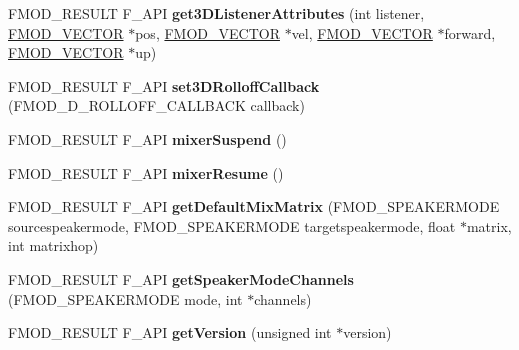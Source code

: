 \begin{DoxyCompactItemize}
\item 
\mbox{\label{classFMOD_1_1System_af141ec87d96230c1c445d6e3c2de224a}} 
F\+M\+O\+D\+\_\+\+R\+E\+S\+U\+LT F\+\_\+\+A\+PI {\bfseries get3\+D\+Listener\+Attributes} (int listener, \hyperlink{structFMOD__VECTOR}{F\+M\+O\+D\+\_\+\+V\+E\+C\+T\+OR} $\ast$pos, \hyperlink{structFMOD__VECTOR}{F\+M\+O\+D\+\_\+\+V\+E\+C\+T\+OR} $\ast$vel, \hyperlink{structFMOD__VECTOR}{F\+M\+O\+D\+\_\+\+V\+E\+C\+T\+OR} $\ast$forward, \hyperlink{structFMOD__VECTOR}{F\+M\+O\+D\+\_\+\+V\+E\+C\+T\+OR} $\ast$up)
\item 
\mbox{\label{classFMOD_1_1System_a4c1e8040d33a4a1852a31a2ec2e64aa7}} 
F\+M\+O\+D\+\_\+\+R\+E\+S\+U\+LT F\+\_\+\+A\+PI {\bfseries set3\+D\+Rolloff\+Callback} (F\+M\+O\+D\+\_\+D\+\_\+\+R\+O\+L\+L\+O\+F\+F\+\_\+\+C\+A\+L\+L\+B\+A\+CK callback)
\item 
\mbox{\label{classFMOD_1_1System_a6e53642e611a3d789821576dc95a2e20}} 
F\+M\+O\+D\+\_\+\+R\+E\+S\+U\+LT F\+\_\+\+A\+PI {\bfseries mixer\+Suspend} ()
\item 
\mbox{\label{classFMOD_1_1System_af95cc86f56519233a4b2a8048ce92ef7}} 
F\+M\+O\+D\+\_\+\+R\+E\+S\+U\+LT F\+\_\+\+A\+PI {\bfseries mixer\+Resume} ()
\item 
\mbox{\label{classFMOD_1_1System_a1a108f68e3f24f7e0145d3e6a51c4e27}} 
F\+M\+O\+D\+\_\+\+R\+E\+S\+U\+LT F\+\_\+\+A\+PI {\bfseries get\+Default\+Mix\+Matrix} (F\+M\+O\+D\+\_\+\+S\+P\+E\+A\+K\+E\+R\+M\+O\+DE sourcespeakermode, F\+M\+O\+D\+\_\+\+S\+P\+E\+A\+K\+E\+R\+M\+O\+DE targetspeakermode, float $\ast$matrix, int matrixhop)
\item 
\mbox{\label{classFMOD_1_1System_a7b1fbfc8836c378af544d07298c3886a}} 
F\+M\+O\+D\+\_\+\+R\+E\+S\+U\+LT F\+\_\+\+A\+PI {\bfseries get\+Speaker\+Mode\+Channels} (F\+M\+O\+D\+\_\+\+S\+P\+E\+A\+K\+E\+R\+M\+O\+DE mode, int $\ast$channels)
\item 
\mbox{\label{classFMOD_1_1System_ac248a1234309ccb8be4c69f6b1a8d07e}} 
F\+M\+O\+D\+\_\+\+R\+E\+S\+U\+LT F\+\_\+\+A\+PI {\bfseries get\+Version} (unsigned int $\ast$version)
\item 
\mbox{\label{classFMOD_1_1System_a0bd90d8ae95bad9f2cca9658b73da96d}} 

\end{DoxyCompactItemize}
